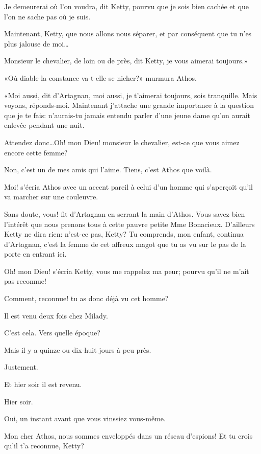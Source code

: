 \speak  Je demeurerai où l'on voudra, dit Ketty, pourvu que je sois bien cachée et que l'on ne sache pas où je suis. 

\speak  Maintenant, Ketty, que nous allons nous séparer, et par conséquent que tu n'es plus jalouse de moi\dots 

\speak  Monsieur le chevalier, de loin ou de près, dit Ketty, je vous aimerai toujours.» 

«Où diable la constance va-t-elle se nicher?» murmura Athos. 

«Moi aussi, dit d'Artagnan, moi aussi, je t'aimerai toujours, sois tranquille. Mais voyons, réponds-moi. Maintenant j'attache une grande importance à la question que je te fais: n'aurais-tu jamais entendu parler d'une jeune dame qu'on aurait enlevée pendant une nuit. 

\speak  Attendez donc\dots Oh! mon Dieu! monsieur le chevalier, est-ce que vous aimez encore cette femme? 

\speak  Non, c'est un de mes amis qui l'aime. Tiens, c'est Athos que voilà. 

\speak  Moi! s'écria Athos avec un accent pareil à celui d'un homme qui s'aperçoit qu'il va marcher sur une couleuvre. 

\speak  Sans doute, vous! fit d'Artagnan en serrant la main d'Athos. Vous savez bien l'intérêt que nous prenons tous à cette pauvre petite Mme Bonacieux. D'ailleurs Ketty ne dira rien: n'est-ce pas, Ketty? Tu comprends, mon enfant, continua d'Artagnan, c'est la femme de cet affreux magot que tu as vu sur le pas de la porte en entrant ici. 

\speak  Oh! mon Dieu! s'écria Ketty, vous me rappelez ma peur; pourvu qu'il ne m'ait pas reconnue! 

\speak  Comment, reconnue! tu as donc déjà vu cet homme? 

\speak  Il est venu deux fois chez Milady. 

\speak  C'est cela. Vers quelle époque? 

\speak  Mais il y a quinze ou dix-huit jours à peu près. 

\speak  Justement. 

\speak  Et hier soir il est revenu. 

\speak  Hier soir. 

\speak  Oui, un instant avant que vous vinssiez vous-même. 

\speak  Mon cher Athos, nous sommes enveloppés dans un réseau d'espions! Et tu crois qu'il t'a reconnue, Ketty? 

